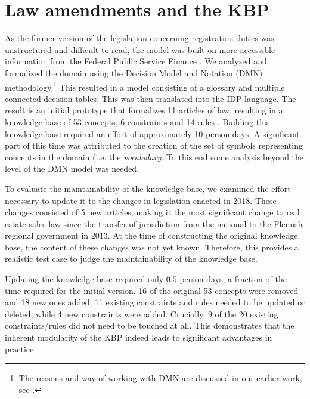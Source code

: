 \section{Law amendments and the KBP}
\label{law}

As the former version of the legislation concerning registration duties  was unstructured and difficult to read, the model was built on more accessible information from the Federal Public Service Finance \cite{FODFinancien}. 
We analyzed and formalized the domain using the Decision Model and Notation (DMN) methodology.\footnote{The reasons and way of working with DMN are discussed in our earlier work, see \cite{ruleml/DeryckHVV18}.}
This resulted in a model consisting of a glossary and multiple connected decision tables. 
This was then translated into the IDP-language.
The result is an initial prototype that formalizes 11 articles of law, resulting in a knowledge base of 53 concepts, 6 constraints and 14 rules \cite{ruleml/DeryckHVV18}. Building this knowledge base required an effort of approximately 10 person-days.
A significant part of this time was attributed to the creation of the set of symbols representing concepts in the domain (i.e. the \emph{vocabulary}. %
To this end some analysis beyond the level of the DMN model was needed.

To evaluate the maintainability of the knowledge base, we examined the effort necessary to update it to the changes in legislation enacted in 2018. 
These changes consisted of 5 new articles, making it the most significant change to real estate sales law since the transfer of jurisdiction from the national to the Flemish regional government in 2013. %
At the time of constructing the original knowledge base, the content of these changes was not yet known.
Therefore, this provides a realistic test case to judge the maintainability of the knowledge base.

Updating the knowledge base required only $0.5$ person-days, a fraction of the time required for the initial version. 
16 of the original 53 concepts were removed and 18 new ones added; 11 existing constraints and rules needed to be updated or deleted, while 4 new constraints were added. 
Crucially, 9 of the 20 existing constraints/rules did not need to be touched at all. 
This demonstrates that the inherent modularity of the KBP indeed leads to significant advantages in practice.

